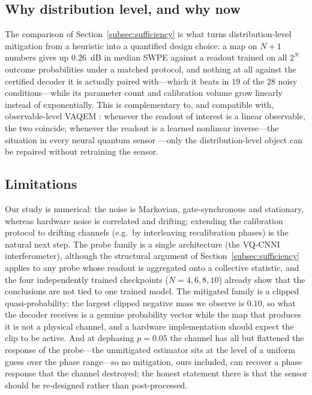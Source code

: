 \documentclass[ASNA,twocolumn]{USG}
\begin{document}
\subsection{Why distribution level, and why now}
The comparison of Section~\ref{subsec:sufficiency} is what turns
distribution-level mitigation from a heuristic into a quantified design choice:
a map on $N+1$ numbers gives up $0.26$~dB in median SWPE against a readout
trained on all $2^N$ outcome probabilities under a matched protocol, and nothing
at all against the certified decoder it is actually paired with---which it beats
in $19$ of the $28$ noisy conditions---while its parameter count and calibration
volume grow linearly instead of exponentially.  This is complementary to, and
compatible with, observable-level
VAQEM \cite{strikis2021learning,lowe2021unified}: whenever the readout of
interest is a linear observable, the two coincide; whenever the readout is a
learned nonlinear inverse---the situation in every neural quantum sensor
\cite{fiderer2021neural,gebhart2023learning,yang2025vqcnni}---only the
distribution-level object can be repaired without retraining the sensor.

\subsection{Limitations}
Our study is numerical: the noise is Markovian, gate-synchronous and stationary,
whereas hardware noise is correlated and drifting; extending the calibration
protocol to drifting channels (e.g.\ by interleaving recalibration phases) is
the natural next step.  The probe family is a single architecture (the
VQ-CNNI interferometer), although the structural argument of
Section~\ref{subsec:sufficiency} applies to any probe whose readout is
aggregated onto a collective statistic, and the four independently trained
checkpoints ($N=4,6,8,10$) already show that the conclusions are not tied to one
trained model.  The mitigated family is a clipped quasi-probability: the largest
clipped negative mass we observe is $0.10$, so what the decoder receives is a
genuine probability vector while the map that produces it is not a physical
channel, and a hardware implementation should expect the clip to be active.  And
at dephasing $p=0.05$ the channel has all but flattened the response of the
probe---the unmitigated estimator sits at the level of a uniform guess over the
phase range---so no mitigation, ours included, can recover a phase response that
the channel destroyed; the honest statement there is that the sensor should be
re-designed rather than post-processed.
\end{document}
